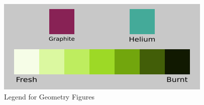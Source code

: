 \begin{figure}[h!]
\centering
\includegraphics[width=0.6\linewidth]{figures/geom-legend}
\caption{Legend for Geometry Figures}
\label{fig:geom-legend}
\end{figure}